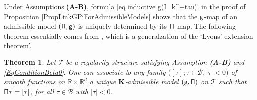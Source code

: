 \documentclass[10pt, reqno]{amsart}
\numberwithin{subsection}{section}
\numberwithin{subsubsection}{subsection}
\numberwithin{equation}{section} %
\theoremstyle{mystyle}
\newtheorem{thm}{Theorem}
\theoremstyle{mystyle2}
\theoremstyle{mystyle3}
\newcommand{\ssk}{\smallskip}
\newcommand\bbR{\mathbb{R}}
\newcommand{\mcB}{\mathcal{B}}
\begin{document}
\ssk

Under Assumptions \textbf{\textsf{(A-B)}}, formula \eqref{eq inductive g(I_k^+tau)} in the proof of Proposition \ref{PropLinkGPiForAdmissibleModels} shows that the $\sf g$-map of an admissible model $\sf (\Pi,g)$ is uniquely determined by its $\sf \Pi$-map. The following theorem essentially comes from \cite[Proposition 3.32]{Hai14}, which is a generalzation of the `Lyons' extension theorem'.

\ssk

\begin{thm} \label{ThmSmoothAdmissibleModels}
Let $\mathscr{T}$ be a regularity structure satisfying Assumption \textbf{\textsf{(A-B)}} and \eqref{EqConditionBeta0}. One can associate to any family $\big([\tau]; \tau\in\mcB, \vert\tau\vert<0\big)$ of smooth functions on $\bbR\times\bbR^d$ a unique $\bf K$-admissible model $({\sf g}, {\sf \Pi})$ on $\mathscr{T}$ such that ${\sf \Pi}\tau = [\tau]$, for all $\tau\in\mcB$ with $\vert\tau\vert<0$.
\end{thm}   

\medskip
\end{document}
